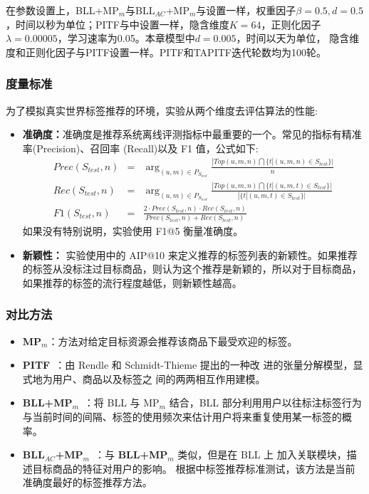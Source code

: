在参数设置上，BLL+MP$_m$与BLL$_{AC}$+MP$_m$与\cite{kowald2014long}设置一样，权重因子$\beta=0.5, d=0.5$，时间以秒为单位；PITF与\cite{rendle2010pairwise}中设置一样，隐含维度$K=64$，正则化因子$\lambda=0.00005$，学习速率为0.05。本章模型中$d=0.005$，时间以天为单位， 隐含维度和正则化因子与PITF设置一样。PITF和TAPITF迭代轮数均为100轮。

\subsubsection{度量标准}
为了模拟真实世界标签推荐的环境，实验从两个维度去评估算法的性能:
\begin{itemize}
	\item \textbf{准确度：}准确度是推荐系统离线评测指标中最重要的一个。常见的指标有精准率(Precision)、召回率 (Recall)以及 F1 值，公式如下:
	\begin{eqnarray}
	\label{eq-wpitf-precision}
	Prec(S_{test},n)&=&\arg_{(u,m)\in P_{S_{test}}}\frac{|Top(u,m,n)\bigcap \{t|(u,m,n)\in S_{test}\}|}{n}\\
	\label{eq-wpitf-recall}
	Rec(S_{test},n)&=&\arg_{(u,m)\in P_{S_{test}}}\frac{|Top(u,m,n)\bigcap \{t|(u,m,t)\in S_{test}\}|}{|\{t|(u,m,t)\in S_{test}\}|}\\
	\label{eq-wpitf-f1}
	F1(S_{test},n)&=&\frac{2 \cdot	Prec(S_{test},n)\cdot Rec(S_{test},n)}{	Prec(S_{test},n)+Rec(S_{test},n)}
	\end{eqnarray}
	如果没有特别说明，实验使用 F1@5 衡量准确度。
	\item \textbf{新颖性：} 实验使用\cite{belem2013exploiting}中的 AIP@10 来定义推荐的标签列表的新颖性。如果推荐的标签从没标注过目标商品，则认为这个推荐是新颖的，所以对于目标商品，如果推荐的标签的流行程度越低，则新颖性越高。
\end{itemize}

\subsubsection{对比方法}
\begin{itemize}
\item \textbf{MP$_{m}$}：方法对给定目标资源会推荐该商品下最受欢迎的标签。
\item \textbf{PITF}~\cite{rendle2010pairwise}：由 Rendle 和 Schmidt-Thieme 提出的一种改 进的张量分解模型，显式地为用户、商品以及标签之 间的两两相互作用建模。
\item \textbf{BLL+MP$_m$}~\cite{kowald2014long}：将 BLL 与 MP$_m$ 结合，BLL 部分利用用户以往标注标签行为与当前时间的间隔、标签的使用频次来估计用户将来重复使用某一标签的概率。
\item \textbf{BLL$_{AC}$+MP$_m$}~\cite{kowald2015refining}：与 \textbf{BLL+MP$_m$} 类似，但是在 BLL 上 加入关联模块，描述目标商品的特征对用户的影响。 根据\cite{kowald2015evaluating}中标签推荐标准测试，该方法是当前准确度最好的标签推荐方法。
\end{itemize}

